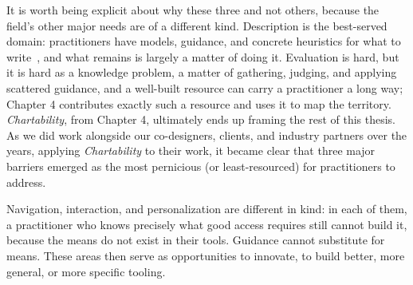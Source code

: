 \documentclass[12pt]{cmuthesis}
\begin{document}
It is worth being explicit about why these three and not others, because the field's other major needs are of a different kind. Description is the best-served domain: practitioners have models, guidance, and concrete heuristics for what to write~\cite{Lundgard2022Accessible, Jung2022Communicating}, and what remains is largely a matter of doing it. Evaluation is hard, but it is hard as a knowledge problem, a matter of gathering, judging, and applying scattered guidance, and a well-built resource can carry a practitioner a long way; Chapter 4 contributes exactly such a resource and uses it to map the territory. \textit{Chartability}, from Chapter 4, ultimately ends up framing the rest of this thesis. As we did work alongside our co-designers, clients, and industry partners over the years, applying \textit{Chartability} to their work, it became clear that three major barriers emerged as the most pernicious (or least-resourced) for practitioners to address.

Navigation, interaction, and personalization are different in kind: in each of them, a practitioner who knows precisely what good access requires still cannot build it, because the means do not exist in their tools. Guidance cannot substitute for means. These areas then serve as opportunities to innovate, to build better, more general, or more specific tooling.
 

\end{document}
